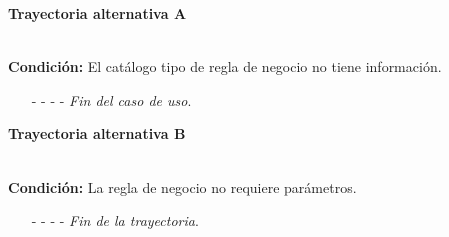\hypertarget{CU8-1:TAA}{\textbf{Trayectoria alternativa A}}\\
\noindent \textbf{Condición:} El catálogo tipo de regla de negocio no tiene información.
\begin{enumerate}
	\UCpaso[\UCsist] Muestra el mensaje  en la pantalla  para indicar que no es posible realizar la operación debido a la falta de información necesaria para el sistema.
	\item[- -] - - {\em {Fin del caso de uso}}.%
\end{enumerate}
\hypertarget{CU8-1:TAB}{\textbf{Trayectoria alternativa B}}\\
\noindent \textbf{Condición:} La regla de negocio no requiere parámetros.
\begin{enumerate}
	\UCpaso[\UCactor] Continúa con el paso \ref{CU8.1-P9} de la trayectoria principal.
	\item[- -] - - {\em {Fin de la trayectoria}}.%
\end{enumerate}
	
